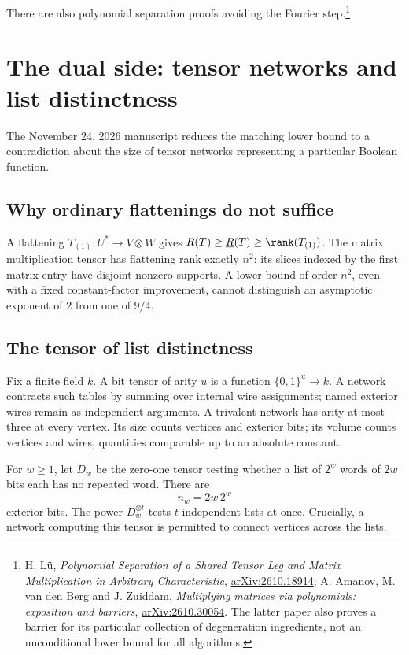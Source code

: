 There are also polynomial separation proofs avoiding the Fourier step.\footnote{H. L\"u, \emph{Polynomial Separation of a Shared Tensor Leg and Matrix Multiplication in Arbitrary Characteristic}, \href{https://arxiv.org/abs/2610.18914}{arXiv:2610.18914}; A. Amanov, M. van den Berg and J. Zuiddam, \emph{Multiplying matrices via polynomials: exposition and barriers}, \href{https://arxiv.org/abs/2610.30054}{arXiv:2610.30054}. The latter paper also proves a barrier for its particular collection of degeneration ingredients, not an unconditional lower bound for all algorithms.}

\section{The dual side: tensor networks and list distinctness}

The November 24, 2026 manuscript reduces the matching lower bound to a contradiction about the size of tensor networks representing a particular Boolean function.

\subsection{Why ordinary flattenings do not suffice}

A flattening \(T_{(1)}:U^*\to V\otimes W\) gives \(R(T)\geq\underline R(T)\geq\rank(T_{(1)})\). The matrix multiplication tensor has flattening rank exactly \(n^2\): its slices indexed by the first matrix entry have disjoint nonzero supports. A lower bound of order \(n^2\), even with a fixed constant-factor improvement, cannot distinguish an asymptotic exponent of \(2\) from one of \(9/4\).

\subsection{The tensor of list distinctness}

Fix a finite field \(k\). A bit tensor of arity \(u\) is a function \(\{0,1\}^u\to k\). A network contracts such tables by summing over internal wire assignments; named exterior wires remain as independent arguments. A trivalent network has arity at most three at every vertex. Its size counts vertices and exterior bits; its volume counts vertices and wires, quantities comparable up to an absolute constant.

For \(w\geq1\), let \(D_w\) be the zero-one tensor testing whether a list of \(2^w\) words of \(2w\) bits each has no repeated word. There are
\[
 n_w=2w\,2^w
\]
exterior bits. The power \(D_w^{\otimes t}\) tests \(t\) independent lists at once. Crucially, a network computing this tensor is permitted to connect vertices across the lists.


